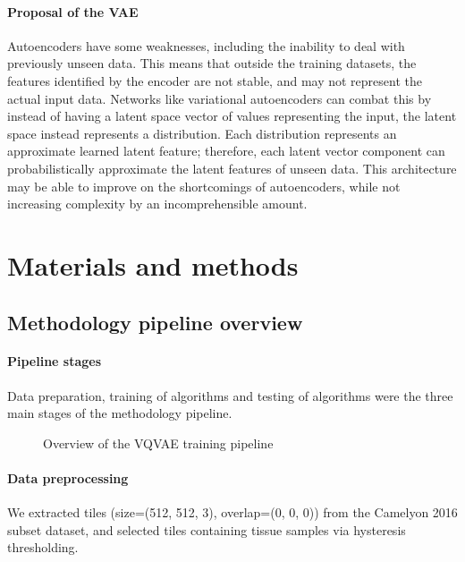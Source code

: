 \documentclass[review]{elsarticle}
\begin{document}
\paragraph{Proposal of the VAE} Autoencoders have some weaknesses, including the inability to deal with previously unseen data. This means that outside the training datasets, the features identified by the encoder are not stable, and may not represent the actual input data. Networks like variational autoencoders can combat this by instead of having a latent space vector of values representing the input, the latent space instead represents a distribution. Each distribution represents an approximate learned latent feature; therefore, each latent vector component can probabilistically approximate the latent features of unseen data.
This architecture may be able to improve on the shortcomings of autoencoders, while not increasing complexity by an incomprehensible amount.

\section{Materials and methods}
\subsection{Methodology pipeline overview}
\paragraph{Pipeline stages} Data preparation, training of algorithms and testing of algorithms were the three main stages of the methodology pipeline.


\begin{figure}
\caption{Overview of the VQVAE training pipeline}
\end{figure}

\paragraph{Data preprocessing}
We extracted tiles (size=(512, 512, 3), overlap=(0, 0, 0)) from the Camelyon 2016 subset dataset, and selected tiles containing tissue samples via hysteresis thresholding.
\end{document}
